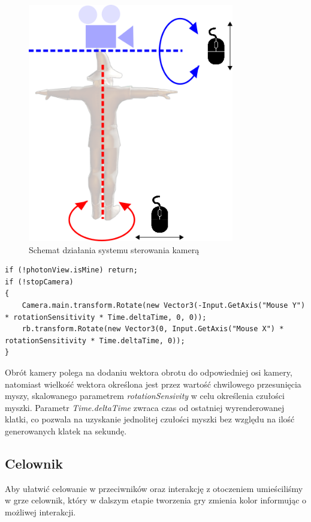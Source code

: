 \documentclass[openright]{xmgr}
\begin{document}
      \begin{figure}[H]
      \center
      \includegraphics[width=9cm]{kamera_2.png}
      \caption{Schemat działania systemu sterowania kamerą}
      \end{figure}

\begin{minipage}{\textwidth}
\begin{lstlisting}[caption={Obrót kamery za pomocą myszy}]
if (!photonView.isMine) return;
if (!stopCamera)
{
    Camera.main.transform.Rotate(new Vector3(-Input.GetAxis("Mouse Y") * rotationSensitivity * Time.deltaTime, 0, 0));
    rb.transform.Rotate(new Vector3(0, Input.GetAxis("Mouse X") * rotationSensitivity * Time.deltaTime, 0));
}
\end{lstlisting}
\end{minipage}

      Obrót kamery polega na dodaniu wektora obrotu do odpowiedniej osi kamery, natomiast wielkość wektora określona jest przez wartość chwilowego przesunięcia myszy, skalowanego parametrem \textit{rotationSensivity} w celu określenia czułości myszki. Parametr \textit{Time.deltaTime} zwraca czas od ostatniej wyrenderowanej klatki, co pozwala na uzyskanie jednolitej czułości myszki bez względu na ilość generowanych klatek na sekundę.

      \subsection{Celownik}

      Aby ułatwić celowanie w przeciwników oraz interakcję z otoczeniem umieściliśmy w grze celownik, który w dalszym etapie tworzenia gry zmienia kolor informując o możliwej interakcji.
\end{document}
